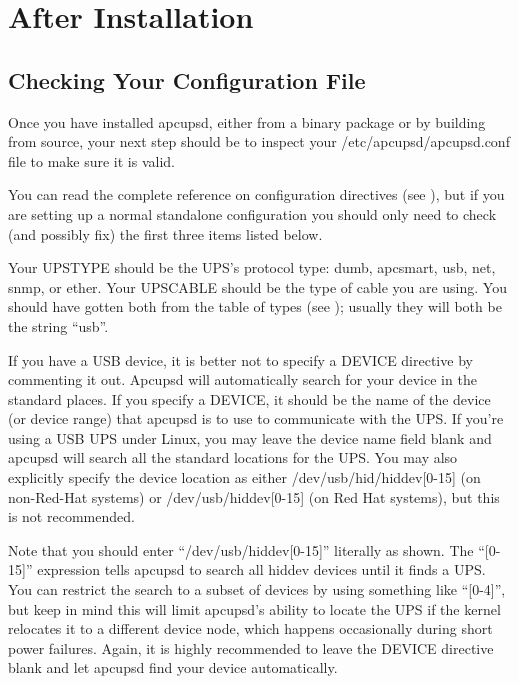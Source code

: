 \section*{After Installation}

\label{index-After-Installation-57}
\label{index-Installation_002c-After-installing-58}

\label{Checking-Your-Configuration-File}

\subsection*{Checking Your Configuration File}

\label{index-Checking-Conf-file-59}
Once you have installed apcupsd, either from a binary package or by building
from source, your next step should be to inspect your
/etc/apcupsd/apcupsd.conf file to make sure it is valid.  

You can read the complete reference on configuration directives (see 
), but if you are
setting up a normal standalone configuration you should only need to check
(and possibly fix) the first three items listed below.  

Your UPSTYPE should be the UPS's protocol type: dumb, apcsmart, usb, net,
snmp, or ether.  Your UPSCABLE should be the type of cable you are using.  You
should have gotten both from the table of types (see 
); usually they will both be the
string ``usb''.  

If you have a USB device, it is better not to specify a DEVICE directive by
commenting it out. Apcupsd will automatically search for your device in the
standard places. If you specify a DEVICE, it should be the name of the device
(or device range) that apcupsd is to use to communicate with the UPS.  If
you're using a USB UPS under Linux, you may leave the device name field blank
and apcupsd will search all the standard locations for the UPS. You may also
explicitly specify the device location as either /dev/usb/hid/hiddev[0-15] (on
non-Red-Hat systems) or /dev/usb/hiddev[0-15] (on Red Hat systems), but this
is not recommended.  

Note that you should enter ``/dev/usb/hiddev[0-15]'' literally as shown.  The
``[0-15]'' expression tells apcupsd to search all hiddev devices until it
finds a UPS. You can restrict the search to a subset of devices by using
something like ``[0-4]'', but keep in mind this will limit apcupsd's ability
to locate the UPS if the kernel relocates it to a different device node, which
happens occasionally during short power failures. Again, it is highly
recommended to leave the DEVICE directive blank and let apcupsd find your
device automatically.  

